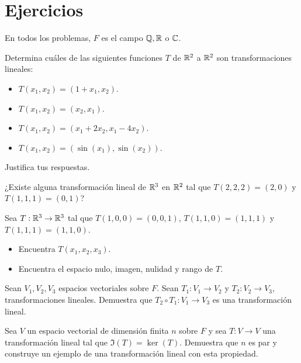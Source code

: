 \documentclass[12pt,a4paper]{book}
\newcommand{\parentesis}[1]{\left(#1\right)}
\begin{document}
    \section{Ejercicios}

    En todos los problemas, $F$ es el campo $\mathbb{Q}, \mathbb{R}$ o $\mathbb{C}$.

    \begin{ejercicio}
        Determina cuáles de las siguientes funciones $T$ de $\mathbb{R}^{2}$ a $\mathbb{R}^{2}$ son transformaciones lineales:
        \begin{itemize}
            \item[(a)] $T(x_{1}, x_{2}) = \parentesis{1 + x_{1}, x_{2}}$.
            \item[(b)] $T(x_{1}, x_{2}) = \parentesis{x_{2}, x_{1}}$.
            \item[(c)] $T(x_{1}, x_{2}) = \parentesis{x_{1} + 2x_{2}, x_{1} - 4x_{2}}$.
            \item[(d)] $T(x_{1}, x_{2}) = \parentesis{\sin(x_{1}), \sin (x_{2})}$.
        \end{itemize}
        Justifica tus respuestas.
    \end{ejercicio}

    \begin{ejercicio}
        ¿Existe alguna transformación lineal de $\mathbb{R}^{3}$ en $\mathbb{R}^{2}$ tal que $T(2, 2, 2) = (2, 0)$ y $T(1, 1, 1) = (0, 1)$?
    \end{ejercicio}

    \begin{ejercicio}
        Sea $T: \mathbb{R}^{3} \to \mathbb{R}^{3}$ tal que $T(1, 0, 0) = (0, 0, 1)$, $T(1, 1, 0) = (1, 1, 1)$ y $T(1, 1, 1) = (1, 1, 0)$.
        \begin{itemize}
            \item[(a)] Encuentra $T(x_{1}, x_{2}, x_{3})$.
            \item[(b)] Encuentra el espacio nulo, imagen, nulidad y rango de $T$.
        \end{itemize}
    \end{ejercicio}

    \begin{ejercicio}
        Sean $V_{1}, V_{2}, V_{3}$ espacios vectoriales sobre $F$. Sean $T_{1}:V_{1} \to V_{2}$ y $T_{2}: V_{2} \to V_{3}$, transformaciones lineales. Demuestra que $T_{2} \circ T_{1} : V_{1} \to V_{3}$ es una transformación lineal.
    \end{ejercicio}

    \begin{ejercicio}
        Sea $V$ un espacio vectorial de dimensión finita $n$ sobre $F$ y sea $T: V \to V$ una transformación lineal tal que $\Im(T) = \ker(T)$. Demuestra que $n$ es par y construye un ejemplo de una transformación lineal con esta propiedad.
    \end{ejercicio}
\end{document}
